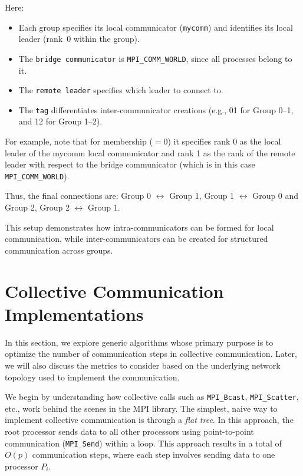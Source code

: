 \documentclass[12pt]{book}
\begin{document}
\begin{example}
Here:
\begin{itemize}
    \item Each group specifies its local communicator (\texttt{mycomm}) and identifies its local leader (rank~0 within the group).
    \item The \texttt{bridge communicator} is \texttt{MPI\_COMM\_WORLD}, since all processes belong to it.
    \item The \texttt{remote leader} specifies which leader to connect to.
    \item The \texttt{tag} differentiates inter-communicator creations (e.g., 01 for Group 0–1, and 12 for Group 1–2).
\end{itemize}  
For example, note that for membership ($=0$) it specifies rank 0 as the local leader of the mycomm local communicator and rank 1 as the rank of the remote leader with respect to the bridge communicator (which is in this case \texttt{MPI\_COMM\_WORLD}).

Thus, the final connections are:
Group 0 $\leftrightarrow$ Group 1, Group 1 $\leftrightarrow$ Group 0 and Group 2, Group 2 $\leftrightarrow$ Group 1.

This setup demonstrates how intra-communicators can be formed for local communication, while inter-communicators can be created for structured communication across groups.
\end{example}

\section{Collective Communication Implementations}
In this section, we explore generic algorithms whose primary purpose is to optimize the number of communication steps in collective communication. Later, we will also discuss the metrics to consider based on the underlying network topology used to implement the communication.

We begin by understanding how collective calls such as \texttt{MPI\_Bcast}, \texttt{MPI\_Scatter}, etc., work behind the scenes in the MPI library. The simplest, naive way to implement collective communication is through a \textit{flat tree}. In this approach, the root processor sends data to all other processors using point-to-point communication (\texttt{MPI\_Send}) within a loop. This approach results in a total of $O(p)$ communication steps, where each step involves sending data to one processor $P_i$.
\end{document}
